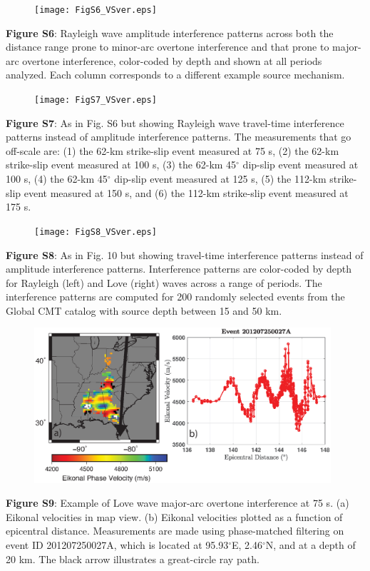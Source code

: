 \documentclass[extra,mreferee]{gji}
\begin{document}
\newpage
\begin{figure}
 \noindent\texttt{[image: FigS6\_VSver.eps]}
\end{figure}
\textbf{Figure S6}: Rayleigh wave amplitude interference patterns across both the distance range prone to minor-arc overtone interference and that prone to major-arc overtone interference, color-coded by depth and shown at all periods analyzed. Each column corresponds to a different example source mechanism.

\newpage
\begin{figure}
 \noindent\texttt{[image: FigS7\_VSver.eps]}
\end{figure}
\textbf{Figure S7}: As in Fig. S6 but showing Rayleigh wave travel-time interference patterns instead of amplitude interference patterns. The measurements that go off-scale are: (1) the 62-km strike-slip event measured at 75 s, (2) the 62-km strike-slip event measured at 100 s, (3) the 62-km 45$^\circ$ dip-slip event measured at 100 s, (4) the 62-km 45$^\circ$ dip-slip event measured at 125 s, (5) the 112-km strike-slip event measured at 150 s, and (6) the 112-km strike-slip event measured at 175 s. 

\newpage
\begin{figure}
 \noindent\texttt{[image: FigS8\_VSver.eps]}
\end{figure}
\textbf{Figure S8}: As in Fig. 10 but showing travel-time interference patterns instead of amplitude interference patterns. Interference patterns are color-coded by depth for Rayleigh (left) and Love (right) waves across a range of periods. The interference patterns are computed for 200 randomly selected events from the Global CMT catalog with source depth between 15 and 50 km.

\newpage
\begin{figure}
\noindent\includegraphics[width=0.98\textwidth]{FigS9_VSver.eps}
\end{figure}
\textbf{Figure S9}: Example of Love wave major-arc overtone interference at 75 s. (a) Eikonal velocities in map view. (b) Eikonal velocities plotted as a function of epicentral distance. Measurements are made using phase-matched filtering on event ID 201207250027A, which is located at 95.93$^\circ$E, 2.46$^\circ$N, and at a depth of 20 km. The black arrow illustrates a great-circle ray path.
\end{document}
